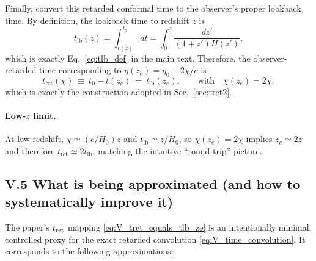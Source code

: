 \documentclass[10pt]{article}
\newcommand{\chis}{\chi}
\newcommand{\tret}{t_{\mathrm{ret}}}
\newcommand{\tlb}{t_{\mathrm{lb}}}
\begin{document}
Finally, convert this retarded conformal time to the observer’s proper lookback time.
By definition, the lookback time to redshift $z$ is
\begin{equation}
\tlb(z) = \int_{t(z)}^{t_0} dt
= \int_{0}^{z} \frac{dz'}{(1+z')H(z')},
\label{eq:V_tlb_def}
\end{equation}
which is exactly Eq.~\eqref{eq:tlb_def} in the main text. Therefore, the observer-retarded time
corresponding to $\eta(z_e)=\eta_0-2\chis/c$ is
\begin{equation}
\tret(\chis)\ \equiv\ t_0 - t(z_e)\ =\ \tlb(z_e),
\qquad
\text{with}\quad \chis(z_e)=2\chis,
\label{eq:V_tret_equals_tlb_ze}
\end{equation}
which is exactly the construction adopted in Sec.~\ref{sec:tret2}.

\paragraph{Low-$z$ limit.}
At low redshift, $\chis\simeq (c/H_0)z$ and $\tlb\simeq z/H_0$, so $\chis(z_e)=2\chis$ implies
$z_e\simeq 2z$ and therefore $\tret\simeq 2\tlb$, matching the intuitive ``round-trip'' picture.

\subsection{V.5 What is being approximated (and how to systematically improve it)}
\label{app:tret_green:errors}

The paper’s $t_{\rm ret}$ mapping \eqref{eq:V_tret_equals_tlb_ze} is an intentionally minimal,
controlled proxy for the exact retarded convolution \eqref{eq:V_time_convolution}.
It corresponds to the following approximations:
\end{document}
